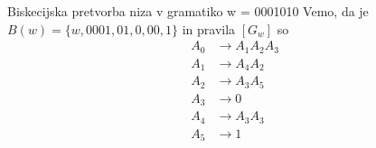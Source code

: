 \documentclass{beamer}
\theoremstyle{definition} %
\begin{document}
\begin{frame}
    \begin{exampleblock}{Biskecijska pretvorba niza v gramatiko w = 0001010}
        Vemo, da je $ B(w) = \{ w, 0001, 01, 0, 00, 1 \} $
        in pravila $ [G_{w}] $ so
        \begin{align*}
            A_0 &\rightarrow A_1 A_2 A_3 \tag{1} \\
            A_1 &\rightarrow A_4 A_2 \tag{2}\\
            A_2 &\rightarrow A_3 A_5 \tag{4}\\
            A_3 &\rightarrow 0 \tag{5} \\
            A_4 &\rightarrow A_3 A_3 \tag{3} \\
            A_5 &\rightarrow 1 \tag{6}
        \end{align*}
    \end{exampleblock}
\end{frame}
\end{document}
